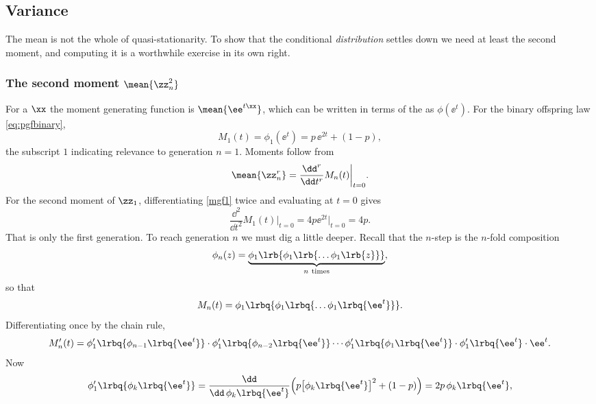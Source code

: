 \subsection{Variance}
\label{sec:variance}

The mean is not the whole of quasi-stationarity. To show that the conditional
\emph{distribution} settles down we need at least the second moment, and computing
it is a worthwhile exercise in its own right.

\subsubsection{The second moment $\mean{\zz_n^2}$}

For a \rv{} $\xx$ the moment generating function is $\mean{\ee^{t\xx}}$, which can be
written in terms of the \pgf{} as $\phi(\ee^t)$. For the binary offspring law
\cref{eq:pgfbinary},
\begin{equation}
\label{mgf1}
M_1(t) = \phi_1(\ee^t) = p\,\ee^{2t} + (1-p),
\end{equation}
the subscript $1$ indicating relevance to generation $n=1$. Moments follow from
\begin{equation}
\label{mgf2}
\mean{\zz_n^r} = \frac{\dd^r}{\dd t^r}M_n(t)\bigg|_{t=0}.
\end{equation}
For the second moment of $\zz_1$, differentiating \cref{mgf1} twice and evaluating at
$t=0$ gives
\begin{equation*}
\frac{\dd^2}{\dd t^2}M_1(t)\bigg|_{t=0} = 4p\ee^{2t}\big|_{t=0} = 4p.
\end{equation*}
That is only the first generation. To reach generation $n$ we must dig a little
deeper. Recall that the $n$-step \pgf{} is the $n$-fold composition
\begin{equation*}
\phi_n(z) = \underset{n\ \text{times}}{\underbrace{\phi_1\lrb{\phi_1\lrb{\dots\phi_1\lrb{z}}}}},
\end{equation*}
so that
\begin{equation*}
M_n(t) = \phi_1\lrbq{\phi_1\lrbq{\dots\phi_1\lrbq{\ee^t}}}.
\end{equation*}
Differentiating once by the chain rule,
\begin{equation}
\label{dmgf1}
M_n'(t) = \phi_1'\lrbq{\phi_{n-1}\lrbq{\ee^t}}\cdot\phi_1'\lrbq{\phi_{n-2}\lrbq{\ee^t}}\cdots\phi_1'\lrbq{\phi_{1}\lrbq{\ee^t}}\cdot\phi_1'\lrbq{\ee^t}\cdot\ee^t .
\end{equation}
Now
\begin{equation*}
\phi_1'\lrbq{\phi_k\lrbq{\ee^t}}
= \frac{\dd}{\dd\,\phi_k\lrbq{\ee^t}}\Bigl(p\bigl[\phi_k\lrbq{\ee^t}\bigr]^2 + (1-p)\Bigr)
= 2p\,\phi_k\lrbq{\ee^t},
\end{equation*}
